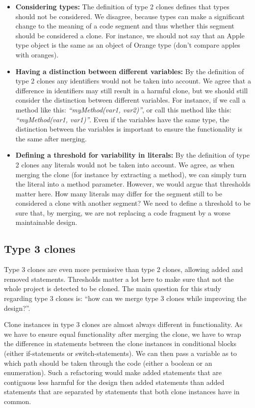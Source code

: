 \documentclass[a4paper]{article}
\begin{document}
\begin{itemize}
  \item \textbf{Considering types:} The definition of type 2 clones defines that types should not be considered. We disagree, because types can make a significant change to the meaning of a code segment and thus whether this segment should be considered a clone. For instance, we should not say that an Apple type object is the same as an object of Orange type (don't compare apples with oranges).
  \item \textbf{Having a distinction between different variables:} By the definition of type 2 clones any identifiers would not be taken into account. We agree that a difference in identifiers may still result in a harmful clone, but we should still consider the distinction between different variables. For instance, if we call a method like this: \textit{``myMethod(var1, var2)''}, or call this method like this: \textit{``myMethod(var1, var1)''}. Even if the variables have the same type, the distinction between the variables is important to ensure the functionality is the same after merging.
  \item \textbf{Defining a threshold for variability in literals:} By the definition of type 2 clones any literals would not be taken into account. We agree, as when merging the clone (for instance by extracting a method), we can simply turn the literal into a method parameter. However, we would argue that thresholds matter here. How many literals may differ for the segment still to be considered a clone with another segment? We need to define a threshold to be sure that, by merging, we are not replacing a code fragment by a worse maintainable design.
\end{itemize}

\subsection{Type 3 clones}
Type 3 clones are even more permissive than type 2 clones, allowing added and removed statements. Thresholds matter a lot here to make sure that not the whole project is detected to be cloned. The main question for this study regarding type 3 clones is: ``how can we merge type 3 clones while improving the design?''.

Clone instances in type 3 clones are almost always different in functionality. As we have to ensure equal functionality after merging the clone, we have to wrap the difference in statements between the clone instances in conditional blocks (either if-statements or switch-statements). We can then pass a variable as to which path should be taken through the code (either a boolean or an enumeration). Such a refactoring would make added statements that are contiguous less harmful for the design then added statements than added statements that are separated by statements that both clone instances have in common.
\end{document}
